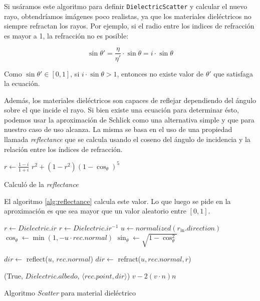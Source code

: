 Si usáramos este algoritmo para definir \texttt{DielectricScatter} y calcular el
nuevo rayo, obtendríamos imágenes poco realistas, ya que los materiales
dieléctricos no siempre refractan los rayos. Por ejemplo, si el radio entre los
indices de refracción es mayor a 1, la refracción no es posible:

\[
  \sin \theta' = \frac{\eta}{\eta'} \cdot \sin \theta = i \cdot \sin \theta
\]

Como $\sin \theta' \in [0, 1]$, si $i \cdot \sin \theta > 1$, entonces no existe valor
de $\theta'$ que satisfaga la ecuación.

Además, los materiales dieléctricos son capaces de reflejar dependiendo del
ángulo sobre el que incide el rayo. Si bien existe una ecuación para determinar
ésto, podemos usar la aproximación de Schlick \cite{schlicksapprox} como una
alternativa simple y que para nuestro caso de uso alcanza. La misma se basa en
el uso de una propiedad llamada \textit{reflectance} que se calcula usando el
coseno del ángulo de incidencia y la relación entre los índices de refracción.

\begin{algorithm}
  \begin{algorithmic}[1]
    \State $r \gets \frac{1 - i}{1 + i}$
    \State \Return $r^2 + (1-r^2) (1 - \cos_{\theta})^5$
    \EndFunction
  \end{algorithmic}
  \caption{Calculó de la \textit{reflectance}}
  \label{alg:reflectance}
\end{algorithm}

El algoritmo \ref{alg:reflectance} calcula este valor. Lo que luego se pide en
la aproximación es que sea mayor que un valor aleatorio entre $[0, 1]$.

\begin{algorithm}
  \begin{algorithmic}[1]
    \State $r \gets Dielectric.ir$
    \State $r \gets Dielectric.ir^{-1}$
    \EndIf
    \State $u \gets normalized(r_{\text{in}}.direction)$
    \State $\cos_{\theta} \gets \min(1, -u \cdot rec.normal)$
    \State $\sin_{\theta} \gets \sqrt{1 - \cos_{\theta}^2}$

    \State $dir \gets$ reflect($u$, $rec.normal$)
    \Else
    \State $dir \gets$ refract($u, rec.normal, r$)
    \EndIf

    \State \Return (True, $Dielectric.albedo$, $\langle rec.point, dir \rangle$)
    \EndFunction
    \State \Return $v - 2 (v \cdot n) n$
    \EndFunction
  \end{algorithmic}
  \caption{Algoritmo \textit{Scatter} para material dieléctrico}
  \label{alg:dielectric-scatter}
\end{algorithm}

